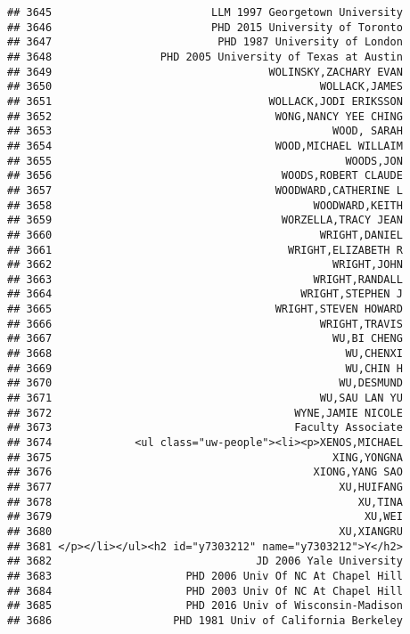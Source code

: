 \documentclass[
]{article}
\begin{document}
\begin{verbatim}
## 3645                         LLM 1997 Georgetown University
## 3646                         PHD 2015 University of Toronto
## 3647                          PHD 1987 University of London
## 3648                 PHD 2005 University of Texas at Austin
## 3649                                  WOLINSKY,ZACHARY EVAN
## 3650                                          WOLLACK,JAMES
## 3651                                  WOLLACK,JODI ERIKSSON
## 3652                                   WONG,NANCY YEE CHING
## 3653                                            WOOD, SARAH
## 3654                                   WOOD,MICHAEL WILLAIM
## 3655                                              WOODS,JON
## 3656                                    WOODS,ROBERT CLAUDE
## 3657                                   WOODWARD,CATHERINE L
## 3658                                         WOODWARD,KEITH
## 3659                                    WORZELLA,TRACY JEAN
## 3660                                          WRIGHT,DANIEL
## 3661                                     WRIGHT,ELIZABETH R
## 3662                                            WRIGHT,JOHN
## 3663                                         WRIGHT,RANDALL
## 3664                                       WRIGHT,STEPHEN J
## 3665                                   WRIGHT,STEVEN HOWARD
## 3666                                          WRIGHT,TRAVIS
## 3667                                            WU,BI CHENG
## 3668                                              WU,CHENXI
## 3669                                              WU,CHIN H
## 3670                                             WU,DESMUND
## 3671                                          WU,SAU LAN YU
## 3672                                      WYNE,JAMIE NICOLE
## 3673                                      Faculty Associate
## 3674             <ul class="uw-people"><li><p>XENOS,MICHAEL
## 3675                                            XING,YONGNA
## 3676                                         XIONG,YANG SAO
## 3677                                             XU,HUIFANG
## 3678                                                XU,TINA
## 3679                                                 XU,WEI
## 3680                                             XU,XIANGRU
## 3681 </p></li></ul><h2 id="y7303212" name="y7303212">Y</h2>
## 3682                                JD 2006 Yale University
## 3683                     PHD 2006 Univ Of NC At Chapel Hill
## 3684                     PHD 2003 Univ Of NC At Chapel Hill
## 3685                     PHD 2016 Univ of Wisconsin-Madison
## 3686                   PHD 1981 Univ of California Berkeley

\end{verbatim}
\end{document}

